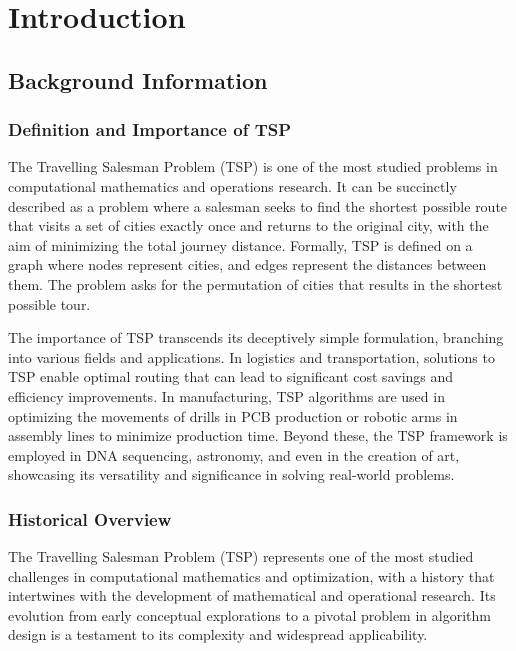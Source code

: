 \chapter{Introduction}\label{chapt:1}
\label{introduction}

\section{Background Information}

\subsection{Definition and Importance of TSP}
The Travelling Salesman Problem (TSP) is one of the most studied problems in computational mathematics and operations research. It can be succinctly described as a problem where a salesman seeks to find the shortest possible route that visits a set of cities exactly once and returns to the original city, with the aim of minimizing the total journey distance. Formally, TSP is defined on a graph where nodes represent cities, and edges represent the distances between them. The problem asks for the permutation of cities that results in the shortest possible tour.

The importance of TSP transcends its deceptively simple formulation, branching into various fields and applications. In logistics and transportation, solutions to TSP enable optimal routing that can lead to significant cost savings and efficiency improvements. In manufacturing, TSP algorithms are used in optimizing the movements of drills in PCB production or robotic arms in assembly lines to minimize production time. Beyond these, the TSP framework is employed in DNA sequencing, astronomy, and even in the creation of art, showcasing its versatility and significance in solving real-world problems.


\subsection{Historical Overview}

The Travelling Salesman Problem (TSP) represents one of the most studied challenges in computational mathematics and optimization, with a history that intertwines with the development of mathematical and operational research. Its evolution from early conceptual explorations to a pivotal problem in algorithm design is a testament to its complexity and widespread applicability.

